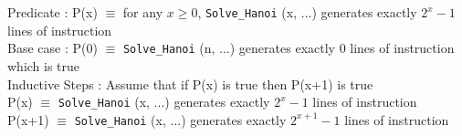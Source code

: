 \documentclass[a4paper, 11pt]{article}
\begin{document}
	Predicate : P(x) $\equiv$ for any $x \geq 0$, \texttt{Solve\_Hanoi} (x, ...) generates exactly $2^x-1$ lines of instruction\\
	
	Base case : P(0) $\equiv$ \texttt{Solve\_Hanoi} (n, ...) generates exactly 0 lines of instruction which is true\\
	
	Inductive Steps : Assume that if P(x) is true then P(x+1) is true\\
	P(x)  $\equiv$ \texttt{Solve\_Hanoi} (x, ...) generates exactly $2^x-1$ lines of instruction\\
	P(x+1)  $\equiv$ \texttt{Solve\_Hanoi} (x, ...) generates exactly $2^{x+1}-1$ lines of instruction\\ %
\end{document}
